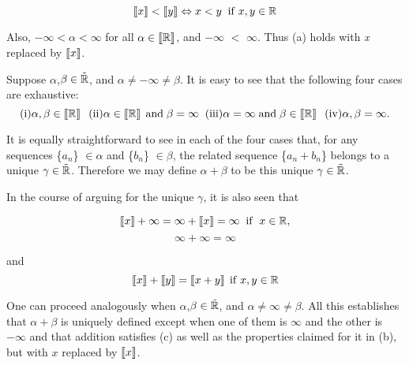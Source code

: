 \documentclass{article}
\begin{document}
\begin{equation} \label{ZEqnNum961558} \left[\kern-0.15em\left[x\right]\kern-0.15em\right]<\left[\kern-0.15em\left[y\right]\kern-0.15em\right]\Leftrightarrow x<y{\rm \; \; if\; }x,y\in {\bf {\mathbb R}} \end{equation}

\noindent Also, $-\infty<\alpha<\infty$ for all $\alpha\in\left[\kern-0.15em\left[{\bf {\mathbb R}}\right]\kern-0.15em\right]$, and $-\infty $ $<$ $\infty$. Thus (a) holds with \textit{x} replaced by $\left[\kern-0.15em\left[x\right]\kern-0.15em\right]$.

Suppose $\alpha$,$\beta\in\tilde{{\bf {\mathbb R}}}$, and $\alpha\neq-\infty\neq\beta$. It is easy to see that the following four cases are exhaustive:
\[{\rm (i)}\alpha ,\beta \in \left[\kern-0.15em\left[{\bf {\mathbb R}}\right]\kern-0.15em\right]{\rm \; \;  (ii)}\alpha \in \left[\kern-0.15em\left[{\bf {\mathbb R}}\right]\kern-0.15em\right]{\rm \; }{\rm a}{\rm n}{\rm d}{\rm \; }\beta =\infty {\rm \; \;  (iii)}\alpha =\infty {\rm \; }{\rm a}{\rm n}{\rm d}{\rm \; }\beta \in \left[\kern-0.15em\left[{\mathbb R}\right]\kern-0.15em\right]{\rm \; \;(}{\rm i}{\rm v}{\rm )}\alpha ,\beta =\infty .\]

\noindent It is equally straightforward to see in each of the four
cases that, for any sequences \{$a_{n}$\} $\in\alpha$ and
\{$b_{n}$\} $\in\beta$, the related sequence \{$a_{n}+b_{n}
$\} belongs to a unique $\gamma\in\tilde{{\bf {\mathbb
R}}}$. Therefore we may define $\alpha+\beta$ to be this unique
$\gamma\in\tilde{{\bf {\mathbb R}}}$.

In the course of arguing for the unique $\gamma$, it is also seen that

\[\left[\kern-0.15em\left[x\right]\kern-0.15em\right]+\infty =\infty +\left[\kern-0.15em\left[x\right]\kern-0.15em\right]=\infty {\rm \; \; if\; \; }x\in {\bf {\mathbb R}}{\rm ,}\]
\[\infty +\infty =\infty \]

\begin{flushleft}
\noindent and
\begin{equation} \label{ZEqnNum487027} \left[\kern-0.15em\left[x\right]\kern-0.15em\right]+\left[\kern-0.15em\left[y\right]\kern-0.15em\right]=\left[\kern-0.15em\left[x+y\right]\kern-0.15em\right]{\rm \; if\; }x,y\in {\bf {\mathbb R}} \end{equation}
\end{flushleft}

One can proceed analogously when $\alpha$,$\beta\in\tilde{{\bf {\mathbb R}}}$, and $\alpha\neq\infty\neq\beta$. All this establishes that $\alpha+\beta$ is uniquely
defined except when one of them is $\infty$ and the other is
$-\infty$ and that addition satisfies (c) as well as the
properties claimed for it in (b), but with $x$ replaced by
$\left[\kern-0.15em\left[x\right]\kern-0.15em\right]$.\\
\end{document}
